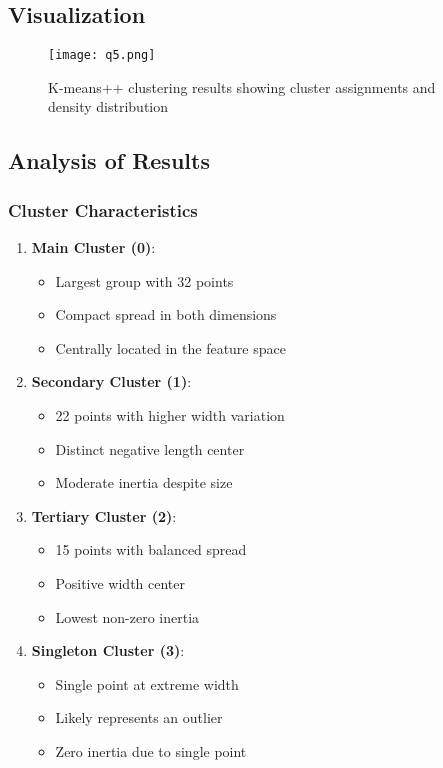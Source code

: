 \documentclass[12pt]{article}
\begin{document}
\subsection{Visualization}
\begin{figure}[H]
\centering
    \texttt{[image: q5.png]}
\caption{K-means++ clustering results showing cluster assignments and density distribution}
\end{figure}

\subsection{Analysis of Results}

\subsubsection{Cluster Characteristics}
\begin{enumerate}
    \item \textbf{Main Cluster (0)}:
    \begin{itemize}
        \item Largest group with 32 points
        \item Compact spread in both dimensions
        \item Centrally located in the feature space
    \end{itemize}
    
    \item \textbf{Secondary Cluster (1)}:
    \begin{itemize}
        \item 22 points with higher width variation
        \item Distinct negative length center
        \item Moderate inertia despite size
    \end{itemize}
    
    \item \textbf{Tertiary Cluster (2)}:
    \begin{itemize}
        \item 15 points with balanced spread
        \item Positive width center
        \item Lowest non-zero inertia
    \end{itemize}
    
    \item \textbf{Singleton Cluster (3)}:
    \begin{itemize}
        \item Single point at extreme width
        \item Likely represents an outlier
        \item Zero inertia due to single point
    \end{itemize}
\end{enumerate}
\end{document}
